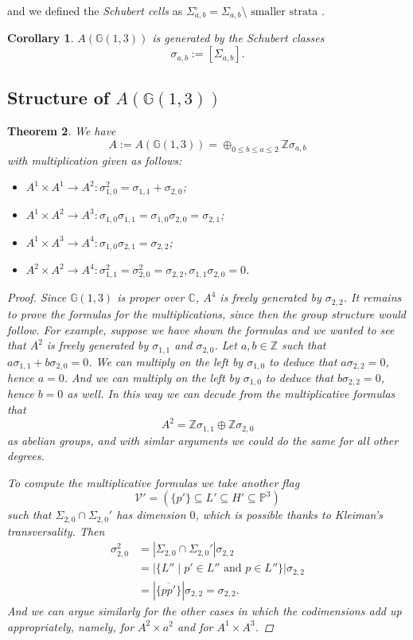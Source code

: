 \documentclass[12pt,a4paper]{amsart}
\theoremstyle{plain}
\newtheorem{thm}{Theorem}[section]
\newtheorem{cor}[thm]{Corollary}
\theoremstyle{definition}
\theoremstyle{remark}
\begin{document}
and we defined the \textit{Schubert cells} as $\Sigma_{a,b}^{\circ}=\Sigma_{a,b} \setminus \text{ smaller strata }$.

\begin{cor}
    $A(\mathbb{G}(1,3))$ is generated by the \textit{Schubert classes}
    \[ \sigma_{a,b}:=[\Sigma_{a,b}]. \]
\end{cor}

\subsection{Structure of $A(\mathbb{G}(1,3))$}

\begin{thm}
    We have
    \[ A:=A(\mathbb{G}(1,3))=\oplus_{0\leq b\leq a \leq 2}\mathbb{Z} \sigma_{a,b} \]
    with multiplication given as follows:
    \begin{itemize}
	\item $A^{1}\times A^{1}\to A^{2}\colon \sigma_{1,0}^{2}=\sigma_{1,1}+\sigma_{2,0}$;
	\item $A^{1}\times A^{2}\to A^{3}\colon \sigma_{1,0}\sigma_{1,1}=\sigma_{1,0}\sigma_{2,0}=\sigma_{2,1}$;
	\item $A^{1}\times A^{3}\to A^{4}\colon \sigma_{1,0}\sigma_{2,1}=\sigma_{2,2}$;
	\item $A^{2}\times A^{2}\to A^{4}\colon \sigma_{1,1}^{2}=\sigma_{2,0}^{2}=\sigma_{2,2},\sigma_{1,1}\sigma_{2,0}=0$.
    \end{itemize}
    \begin{proof}
	Since $\mathbb{G}(1,3)$ is proper over $\mathbb{C}$, $A^{4}$ is freely generated by $\sigma_{2,2}$.
	It remains to prove the formulas for the multiplications, since then the group structure would follow.
	For example, suppose we have shown the formulas and we wanted to see that $A^{2}$ is freely generated by $\sigma_{1,1}$ and $\sigma_{2,0}$.
	Let $a,b\in \mathbb{Z}$ such that $a\sigma_{1,1}+b\sigma_{2,0}=0$.
	We can multiply on the left by $\sigma_{1,0}$ to deduce that $a\sigma_{2,2}=0$, hence $a=0$.
	And we can multiply on the left by $\sigma_{1,0}$ to deduce that $b\sigma_{2,2}=0$, hence $b=0$ as well.
	In this way we can decude from the multiplicative formulas that
	\[ A^{2}= \mathbb{Z} \sigma_{1,1}\oplus \mathbb{Z} \sigma_{2,0} \]
	as abelian groups, and with simlar arguments we could do the same for all other degrees.

	To compute the multiplicative formulas we take another flag
	\[ \mathcal{V}'=\left(\{p'\}\subseteq L'\subseteq H'\subseteq \mathbb{P}^{3}\right) \]
	such that $\Sigma_{2,0}\cap \Sigma_{2,0}'$ has dimension $0$, which is possible thanks to Kleiman's transversality.
	Then
	\begin{align*}
	    \sigma_{2,0}^{2} &=|\Sigma_{2,0}\cap \Sigma_{2,0}'|\sigma_{2,2} \\
	     & =|\{ L''\mid p'\in L''\text{ and }p\in L''\}|\sigma_{2,2} \\
	     & = |\{ \overline{pp'}\}|\sigma_{2,2}=\sigma_{2,2}.
	\end{align*}
	And we can argue similarly for the other cases in which the codimensions add up appropriately, namely, for $A^{2}\times a^{2}$ and for $A^{1}\times A^{3}$.


\end{proof}
\end{thm}
\end{document}
